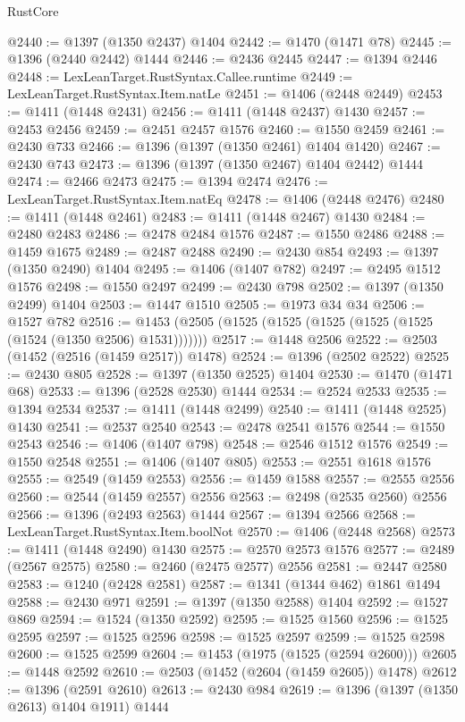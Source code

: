 \begin{lexlean}{RustCore}
\begin{coremodule}
@2440 := @1397 (@1350 @2437) @1404
@2442 := @1470 (@1471 @78)
@2445 := @1396 (@2440 @2442) @1444
@2446 := @2436 @2445
@2447 := @1394 @2446
@2448 := LexLeanTarget.RustSyntax.Callee.runtime
@2449 := LexLeanTarget.RustSyntax.Item.natLe
@2451 := @1406 (@2448 @2449)
@2453 := @1411 (@1448 @2431)
@2456 := @1411 (@1448 @2437) @1430
@2457 := @2453 @2456
@2459 := @2451 @2457 @1576
@2460 := @1550 @2459
@2461 := @2430 @733
@2466 := @1396 (@1397 (@1350 @2461) @1404 @1420)
@2467 := @2430 @743
@2473 := @1396 (@1397 (@1350 @2467) @1404 @2442) @1444
@2474 := @2466 @2473
@2475 := @1394 @2474
@2476 := LexLeanTarget.RustSyntax.Item.natEq
@2478 := @1406 (@2448 @2476)
@2480 := @1411 (@1448 @2461)
@2483 := @1411 (@1448 @2467) @1430
@2484 := @2480 @2483
@2486 := @2478 @2484 @1576
@2487 := @1550 @2486
@2488 := @1459 @1675
@2489 := @2487 @2488
@2490 := @2430 @854
@2493 := @1397 (@1350 @2490) @1404
@2495 := @1406 (@1407 @782)
@2497 := @2495 @1512 @1576
@2498 := @1550 @2497
@2499 := @2430 @798
@2502 := @1397 (@1350 @2499) @1404
@2503 := @1447 @1510
@2505 := @1973 @34 @34
@2506 := @1527 @782
@2516 := @1453 (@2505 (@1525 (@1525 (@1525 (@1525 (@1525 (@1524 (@1350 @2506) @1531)))))))
@2517 := @1448 @2506
@2522 := @2503 (@1452 (@2516 (@1459 @2517)) @1478)
@2524 := @1396 (@2502 @2522)
@2525 := @2430 @805
@2528 := @1397 (@1350 @2525) @1404
@2530 := @1470 (@1471 @68)
@2533 := @1396 (@2528 @2530) @1444
@2534 := @2524 @2533
@2535 := @1394 @2534
@2537 := @1411 (@1448 @2499)
@2540 := @1411 (@1448 @2525) @1430
@2541 := @2537 @2540
@2543 := @2478 @2541 @1576
@2544 := @1550 @2543
@2546 := @1406 (@1407 @798)
@2548 := @2546 @1512 @1576
@2549 := @1550 @2548
@2551 := @1406 (@1407 @805)
@2553 := @2551 @1618 @1576
@2555 := @2549 (@1459 @2553)
@2556 := @1459 @1588
@2557 := @2555 @2556
@2560 := @2544 (@1459 @2557) @2556
@2563 := @2498 (@2535 @2560) @2556
@2566 := @1396 (@2493 @2563) @1444
@2567 := @1394 @2566
@2568 := LexLeanTarget.RustSyntax.Item.boolNot
@2570 := @1406 (@2448 @2568)
@2573 := @1411 (@1448 @2490) @1430
@2575 := @2570 @2573 @1576
@2577 := @2489 (@2567 @2575)
@2580 := @2460 (@2475 @2577) @2556
@2581 := @2447 @2580
@2583 := @1240 (@2428 @2581)
@2587 := @1341 (@1344 @462) @1861 @1494
@2588 := @2430 @971
@2591 := @1397 (@1350 @2588) @1404
@2592 := @1527 @869
@2594 := @1524 (@1350 @2592)
@2595 := @1525 @1560
@2596 := @1525 @2595
@2597 := @1525 @2596
@2598 := @1525 @2597
@2599 := @1525 @2598
@2600 := @1525 @2599
@2604 := @1453 (@1975 (@1525 (@2594 @2600)))
@2605 := @1448 @2592
@2610 := @2503 (@1452 (@2604 (@1459 @2605)) @1478)
@2612 := @1396 (@2591 @2610)
@2613 := @2430 @984
@2619 := @1396 (@1397 (@1350 @2613) @1404 @1911) @1444

\end{coremodule}
\end{lexlean}
